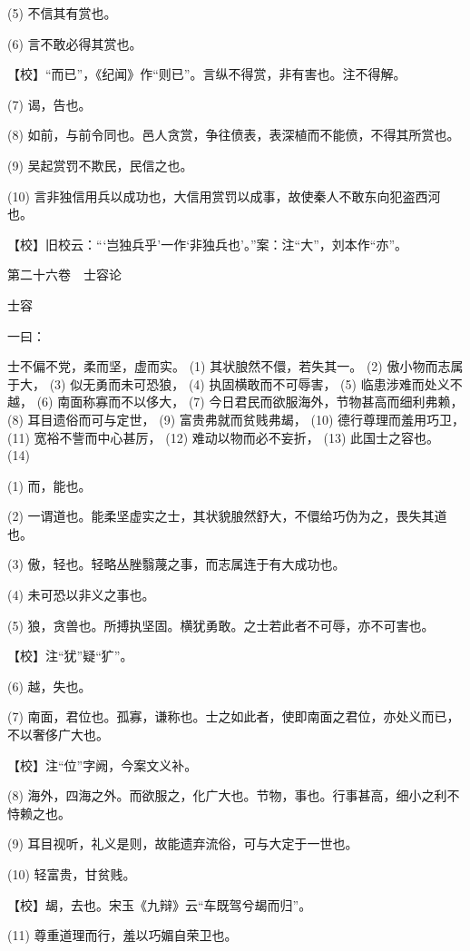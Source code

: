 \documentclass[12pt,UTF8]{ctexbook}
\begin{document}
(5) 不信其有赏也。

(6) 言不敢必得其赏也。

【校】“而已”，《纪闻》作“则已”。言纵不得赏，非有害也。注不得解。

(7) 谒，告也。

(8) 如前，与前令同也。邑人贪赏，争往偾表，表深植而不能偾，不得其所赏也。

(9) 吴起赏罚不欺民，民信之也。

(10) 言非独信用兵以成功也，大信用赏罚以成事，故使秦人不敢东向犯盗西河也。

【校】旧校云：“‘岂独兵乎’一作‘非独兵也’。”案：注“大”，刘本作“亦”。





第二十六卷　士容论



士容


一曰：

士不偏不党，柔而坚，虚而实。 (1) 其状朖然不儇，若失其一。 (2) 傲小物而志属于大， (3) 似无勇而未可恐狼， (4) 执固横敢而不可辱害， (5) 临患涉难而处义不越， (6) 南面称寡而不以侈大， (7) 今日君民而欲服海外，节物甚高而细利弗赖， (8) 耳目遗俗而可与定世， (9) 富贵弗就而贫贱弗朅， (10) 德行尊理而羞用巧卫， (11) 宽裕不訾而中心甚厉， (12) 难动以物而必不妄折， (13) 此国士之容也。 (14)

(1) 而，能也。

(2) 一谓道也。能柔坚虚实之士，其状貌朖然舒大，不儇给巧伪为之，畏失其道也。

(3) 傲，轻也。轻略丛脞翳蔑之事，而志属连于有大成功也。

(4) 未可恐以非义之事也。

(5) 狼，贪兽也。所搏执坚固。横犹勇敢。之士若此者不可辱，亦不可害也。

【校】注“犹”疑“犷”。

(6) 越，失也。

(7) 南面，君位也。孤寡，谦称也。士之如此者，使即南面之君位，亦处义而已，不以奢侈广大也。

【校】注“位”字阙，今案文义补。

(8) 海外，四海之外。而欲服之，化广大也。节物，事也。行事甚高，细小之利不恃赖之也。

(9) 耳目视听，礼义是则，故能遗弃流俗，可与大定于一世也。

(10) 轻富贵，甘贫贱。

【校】朅，去也。宋玉《九辩》云“车既驾兮朅而归”。

(11) 尊重道理而行，羞以巧媚自荣卫也。
\end{document}
